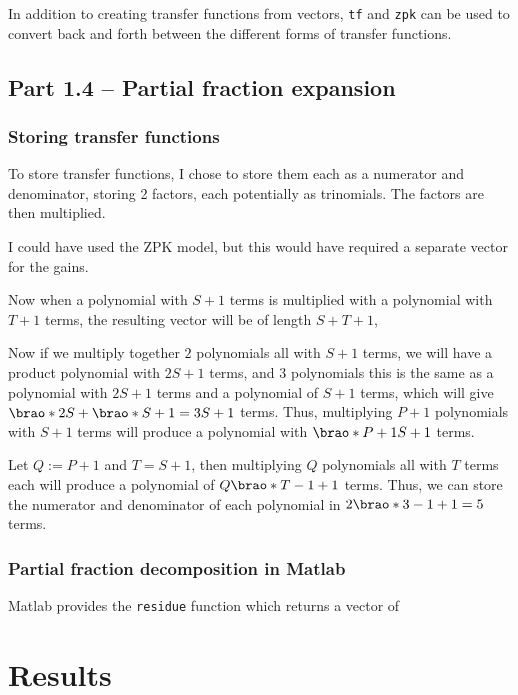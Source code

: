 \documentclass[12pt]{article}
\DeclarePairedDelimiter\brao()%
\begin{document}
In addition to creating transfer functions from vectors, 
\texttt{tf} and \texttt{zpk} can be used to convert back and forth between the different forms of transfer functions.

\subsection{Part 1.4 -- Partial fraction expansion}

\subsubsection{Storing transfer functions}

To store transfer functions,
I chose to store them each as a numerator and denominator, storing 2 factors, each potentially as trinomials.
The factors are then multiplied.

I could have used the ZPK model, but this would have required a separate vector for the gains.

Now when a polynomial with $S + 1$ terms is multiplied with a polynomial with $T + 1$ terms, the resulting vector will be of length $S + T + 1$,

Now if we multiply together $2$ polynomials all with $S + 1$ terms,
we will have a product polynomial with $2S + 1$ terms,
and $3$ polynomials this is the same as a polynomial with $2S + 1$ terms and a polynomial of $S + 1$ terms, which
will give $\brao*{2S} + \brao*{S} + 1 = 3S + 1$ terms.
Thus, multiplying $P + 1$ polynomials with $S + 1$ terms will produce a polynomial with $\brao*{P + 1}S + 1$ terms.

Let $Q := P + 1$ and $T = S + 1$, then multiplying $Q$ polynomials all with $T$ terms each will produce a polynomial of $Q\brao*{T - 1} + 1$ terms. Thus, we can store the numerator and denominator of each polynomial in $2\brao*{3 - 1} + 1 = 5$ terms.

\subsubsection{Partial fraction decomposition in Matlab}

Matlab provides the \texttt{residue} function which returns a vector of 

\section{Results}
\end{document}
